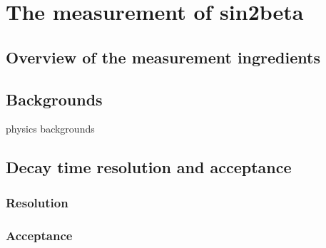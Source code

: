 
\chapter{The measurement of sin2beta}
\label{ch:measurement_of_sin2beta}

\section{Overview of the measurement ingredients}
\label{sec:measurement_of_sin2beta:overview}





\section{Backgrounds}
\label{sec:measurement_of_sin2beta:physic_backgrounds}

physics backgrounds

\clearpage
\section{Decay time resolution and acceptance}
\label{sec:measurement_of_sin2beta:resolution_and_acceptance}
\subsection{Resolution}
\label{sec:measurement_of_sin2beta:resolution_and_acceptance:resolution}
\subsection{Acceptance}
\label{sec:measurement_of_sin2beta:resolution_and_acceptance:acceptance}
